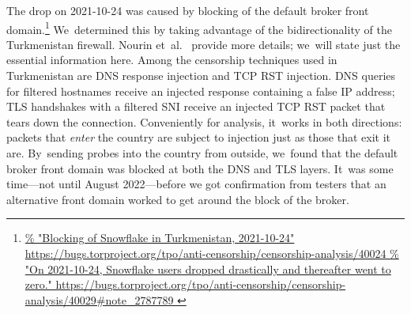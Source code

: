 \documentclass[letterpaper,twocolumn]{article}
\newlength{\urlfootnotesize}
\newcommand{\urlfootnote}[1]{\footnote{
\raggedright\fontsize{\urlfootnotesize}{\urlfootnotesize}\selectfont\url{#1}
}}
\begin{document}
The drop on \mbox{2021-10-24} was caused by
blocking of the default broker front domain.\urlfootnote{
https://bugs.torproject.org/tpo/anti-censorship/censorship-analysis/40024
}
We~determined this by
taking advantage of the bidirectionality of the Turkmenistan firewall.
Nourin et~al.~\cite[\S 2]{Nourin2023a} provide more details;
we~will state just the essential information here.
Among the censorship techniques used in Turkmenistan
are DNS response injection and TCP RST injection.
DNS queries for filtered hostnames receive an injected response
containing a false IP address;
TLS handshakes with a filtered SNI receive an injected TCP RST packet
that tears down the connection.
Conveniently for analysis,
it~works in both directions:
packets that \emph{enter} the country are subject to injection
just as those that exit it are.
By~sending probes into the country from outside,
we~found that the default broker front domain
was blocked at both the DNS and TLS layers.
It~was some time---not until August 2022---before we got
confirmation from testers that an alternative front domain
worked to get around the block of the broker.

\end{document}

